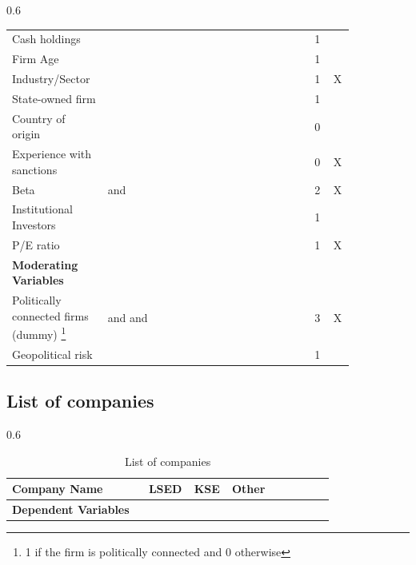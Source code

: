 \documentclass[12pt,a4paper]{article}
\begin{document}
{\begin{appendix}
\begin{landscape}
\begin{spacing}{0.6}
\begin{longtable}[c]{p{0.20\linewidth} p{0.55\linewidth} p{0.05\linewidth} p{0.05\linewidth}}
Cash holdings & \cite{ghasseminejad_impact_2021} & 1 & \\
Firm Age & \cite{tee_financial_2023} & 1 & \\
Industry/Sector & \cite{balyuk_divesting_2023} & 1 & X \\
State-owned firm & \cite{li_china-us_2020} & 1 & \\
Country of origin &  & 0 & \\
Experience with sanctions &  & 0 & X\\
Beta & \cite{faraji_political_2020} and \cite{he_hurting_2017} & 2 & X\\
Institutional Investors & \cite{faraji_political_2020} & 1 & \\
P/E ratio & \cite{faraji_political_2020} & 1 & X\\
\hline
\textbf{Moderating Variables}& & &\\
Politically connected firms (dummy) \footnote{1 if the firm is politically connected and 0 otherwise} & \cite{tee_financial_2023} and \cite{ghasseminejad_impact_2021} and \cite{he_hurting_2017} & 3 & X\\
Geopolitical risk & \cite{tee_financial_2023} & 1 & \\
\hline
\end{longtable}
\end{spacing}
\end{landscape}


\begin{landscape}
\section{List of companies}
\begin{spacing}{0.6}
\fontsize{6}{11}\selectfont
\begin{longtable}[c]{p{0.40\linewidth} p{0.05\linewidth} p{0.05\linewidth} p{0.30\linewidth}}
\caption{List of companies}
\label{list_of_companies}
\\
\hline
  \textbf{Company Name} & \textbf{LSED} & \textbf{KSE} & \textbf{Other} \\ 
\hline
\textbf{Dependent Variables} & & &  \\

\hline
\end{longtable}
\end{spacing}
\end{landscape}


\newpage

\end{appendix}}
\end{document}
